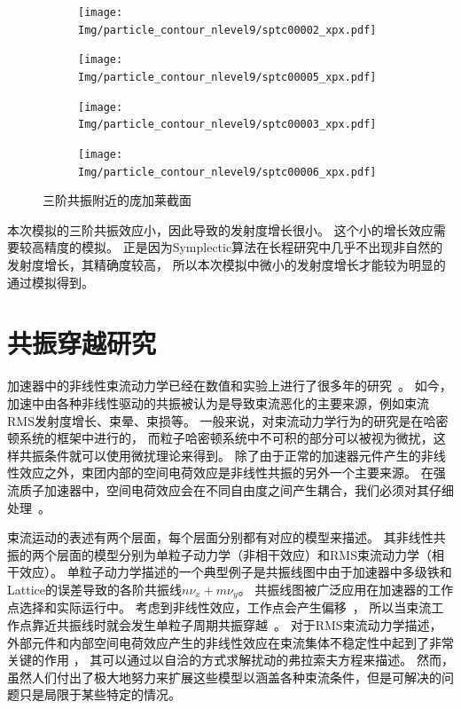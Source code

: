 \begin{figure}[!htb]
    \centering
    \begin{subfigure}[b]{0.48\textwidth}
        \texttt{[image: Img/particle\_contour\_nlevel9/sptc00002\_xpx.pdf]}
        \caption{}
    \end{subfigure}
    \begin{subfigure}[b]{0.48\textwidth}
        \texttt{[image: Img/particle\_contour\_nlevel9/sptc00005\_xpx.pdf]}
        \caption{}
    \end{subfigure}
    \begin{subfigure}[b]{0.48\textwidth}
        \texttt{[image: Img/particle\_contour\_nlevel9/sptc00003\_xpx.pdf]}
        \caption{}
    \end{subfigure}
    \begin{subfigure}[b]{0.48\textwidth}
        \texttt{[image: Img/particle\_contour\_nlevel9/sptc00006\_xpx.pdf]}
        \caption{}
    \end{subfigure}
    \caption{三阶共振附近的庞加莱截面}\label{fig:Poincare}
\end{figure}
本次模拟的三阶共振效应小，因此导致的发射度增长很小。
这个小的增长效应需要较高精度的模拟。
正是因为Symplectic算法在长程研究中几乎不出现非自然的发射度增长，其精确度较高，
所以本次模拟中微小的发射度增长才能较为明显的通过模拟得到。

\section{共振穿越研究}            \label{section:Resonance_crossing}
加速器中的非线性束流动力学已经在数值和实验上进行了很多年的研究~\cite{accelerator2004lee,reiser2008theory}。
如今，加速中由各种非线性驱动的共振被认为是导致束流恶化的主要来源，例如束流RMS发射度增长、束晕、束损等。
一般来说，对束流动力学行为的研究是在哈密顿系统的框架中进行的，
而粒子哈密顿系统中不可积的部分可以被视为微扰，这样共振条件就可以使用微扰理论来得到。
除了由于正常的加速器元件产生的非线性效应之外，束团内部的空间电荷效应是非线性共振的另外一个主要来源。
在强流质子加速器中，空间电荷效应会在不同自由度之间产生耦合，我们必须对其仔细处理~\cite{accelerator2013chao}。

束流运动的表述有两个层面，每个层面分别都有对应的模型来描述。
其非线性共振的两个层面的模型分别为单粒子动力学（非相干效应）和RMS束流动力学（相干效应）。
单粒子动力学描述的一个典型例子是共振线图中由于加速器中多级铁和Lattice的误差导致的各阶共振线$n\nu_x+m\nu_y$。
共振线图被广泛应用在加速器的工作点选择和实际运行中。
考虑到非线性效应，工作点会产生偏移~\cite{fedotov2001space}，
所以当束流工作点靠近共振线时就会发生单粒子周期共振穿越~\cite{franchetti2006particle}。
对于RMS束流动力学描述，外部元件和内部空间电荷效应产生的非线性效应在束流集体不稳定性中起到了非常关键的作用
\cite{sacherer1968transverse, sacherer1973longitudinal}，
其可以通过以自洽的方式求解扰动的弗拉索夫方程来描述\cite{chao1993physics,gluckstern1970oscillation,gluckstern1970stability}。
然而，虽然人们付出了极大地努力来扩展这些模型以涵盖各种束流条件，但是可解决的问题只是局限于某些特定的情况。

